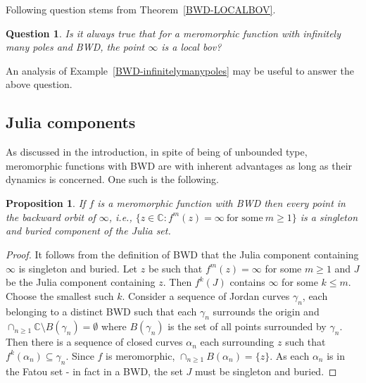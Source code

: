 \documentclass[11pt,a4paper]{article}
\newtheorem{prop}[theorem]{Proposition}
\newtheorem{Question}{Question}
\begin{document}
Following question stems from Theorem~\ref{BWD-LOCALBOV}.
\begin{Question}
	Is it always true that for a meromorphic function with infinitely many poles and BWD, the point $\infty$ is a local bov?
\end{Question}
	An analysis of Example~\ref{BWD-infinitelymanypoles} may be useful to answer the above question. 
 	\subsection{Julia components}
 	As discussed in the introduction, in spite of being of unbounded type, meromorphic functions with BWD are with inherent advantages as long as their dynamics is concerned. One such is the following.	
 	\begin{prop}
 		If $f$ is a meromorphic function with BWD then every point in the backward orbit of $\infty$, i.e., $\{z \in \widehat{\mathbb{C}}: f^m (z)=\infty~\mbox{for some}~m \geq 1\}$ is a singleton and buried component of the Julia set.
 \label{pre-poles}
 	\end{prop} 
 	\begin{proof}
 		It follows from the definition of BWD that  the Julia component containing $\infty$ is singleton and buried. Let $z$ be such that $f^m (z)=\infty$ for some $m\geq 1$ and  $J$ be the Julia component containing $z$. Then $f^k(J)$ contains $\infty$ for some $k \leq m$. Choose the smallest such $k$. Consider a sequence of Jordan curves $\gamma_n$, each belonging to a distinct BWD such that each $\gamma_n$ surrounds the origin and $\cap_{n \geq 1} \mathbb{C} \setminus B(\gamma_n) = \emptyset$ where $B(\gamma_n)$ is the set of all points surrounded by $\gamma_n$. Then there is a sequence of closed curves $\alpha_n$ each surrounding $z$ such that $f^k (\alpha_n) \subseteq \gamma_n$.  Since $f$ is meromorphic, $\cap_{n \geq 1} B(\alpha_n) =\{z\}$. As each $\alpha_n$ is in the Fatou set - in fact in a BWD,  the set $J$ must be singleton and buried.
 	\end{proof}
\end{document}
